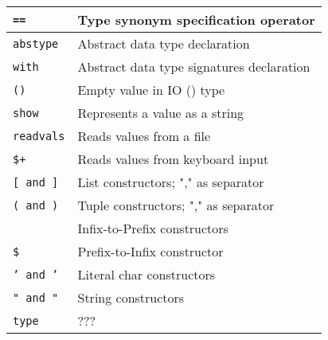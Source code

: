 \documentclass[]{article}
\begin{document}
\begin{minipage}[t][0pt]{\linewidth}
\begin{tabular}{ | l | l | }
	\texttt{==}                     & Type synonym specification operator               \\ \hline
	\texttt{abstype}                & Abstract data type declaration                    \\ \hline
	\texttt{with}                   & Abstract data type signatures declaration         \\ \hline
	\texttt{()}                     & Empty value in IO () type                         \\ \hline
	\hline
	\texttt{show}                   & Represents a value as a string                    \\ \hline
	\texttt{readvals}               & Reads values from a file                          \\ \hline
	\texttt{\$+}                    & Reads values from keyboard input                  \\ \hline
	\hline
	\texttt{[ and ]}                & List constructors; "," as separator               \\ \hline
	\texttt{( and )}                & Tuple constructors; "," as separator              \\ 
	                                & Infix-to-Prefix constructors                      \\ \hline
	\texttt{\$}                     & Prefix-to-Infix constructor                       \\ \hline
	\texttt{' and '}                & Literal char constructors                         \\ \hline
	\texttt{" and "}                & String constructors                               \\ \hline
	\texttt{type}                   & ???                                               \\ \hline
\end{tabular}

\end{minipage}
\end{document}
